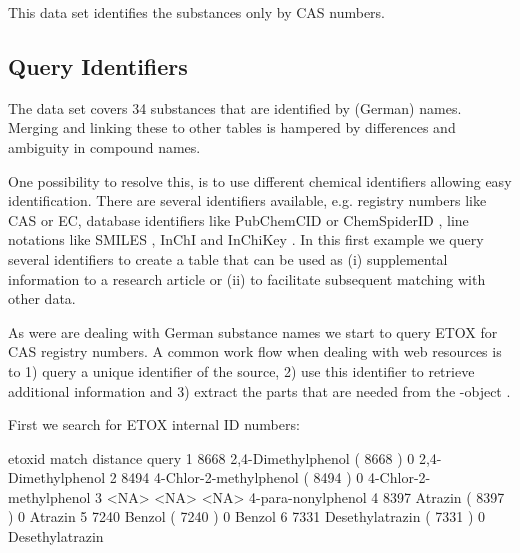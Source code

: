 \documentclass[article, shortnames]{jss}\usepackage[]{graphicx}\usepackage[]{color}
\begin{document}
This data set identifies the substances only by CAS numbers.


\subsection[Query Identifiers]{Query Identifiers}
The  data set covers 34 substances that are identified by (German) names.
Merging and linking these to other tables is hampered by differences and ambiguity in compound names.

One possibility to resolve this, is to use different chemical identifiers allowing easy identification.
There are several identifiers available, e.g.  registry numbers like CAS or EC, database identifiers like PubChemCID \citep{Kim_2016} or ChemSpiderID \citep{pence_chemspider:_2010}, line notations like SMILES \citep{Weininger_1990}, InChI and InChiKey \citep{Heller_McNaught_Pletnev_Stein_Tchekhovskoi_2015}. 
In this first example we query several identifiers to create a table that can be used as (i) supplemental information to a research article or (ii) to facilitate subsequent matching with other data.

As were are dealing with German substance names we start to query ETOX for CAS registry numbers.
A common work flow when dealing with web resources is to 1) query a unique identifier of the source, 2) use this identifier to retrieve additional information and 3) extract the parts that are needed from the -object \citep{Chamberlain_Szocs_2013}.

First we search for ETOX internal ID numbers:

\begin{CodeChunk}
\begin{CodeOutput}
  etoxid                           match distance                  query
1   8668     2,4-Dimethylphenol ( 8668 )        0     2,4-Dimethylphenol
2   8494 4-Chlor-2-methylphenol ( 8494 )        0 4-Chlor-2-methylphenol
3   <NA>                            <NA>     <NA>     4-para-nonylphenol
4   8397                Atrazin ( 8397 )        0                Atrazin
5   7240                 Benzol ( 7240 )        0                 Benzol
6   7331        Desethylatrazin ( 7331 )        0        Desethylatrazin
\end{CodeOutput}
\end{CodeChunk}
\end{document}
